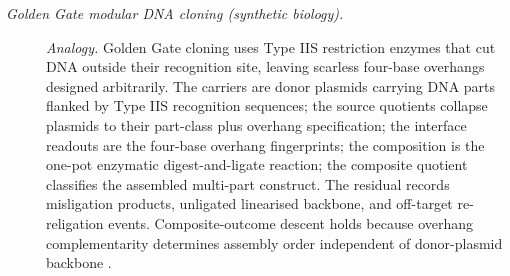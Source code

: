 \begin{description}
\item[\emph{Golden Gate modular {DNA} cloning
(synthetic biology).}] \textit{Analogy.}
Golden Gate cloning uses Type IIS restriction enzymes
that cut DNA outside their recognition site, leaving
scarless four-base overhangs designed arbitrarily.
The carriers are donor plasmids carrying DNA parts
flanked by Type IIS recognition sequences; the source
quotients collapse plasmids to their part-class plus
overhang specification; the interface readouts are the
four-base overhang fingerprints; the composition is the
one-pot enzymatic digest-and-ligate reaction; the
composite quotient classifies the assembled multi-part
construct.  The residual records misligation products,
unligated linearised backbone, and off-target
re-religation events.  Composite-outcome descent holds
because overhang complementarity determines assembly
order independent of donor-plasmid backbone
\citep{Engler2008GoldenGate}.
\end{description}
\endgroup

